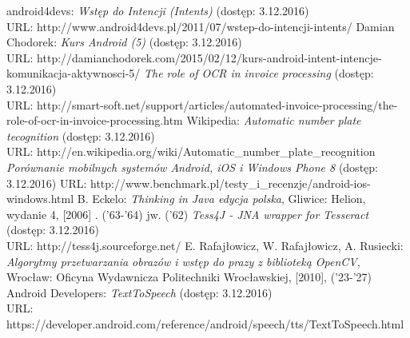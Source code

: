 \documentclass[eng,oneside]{mgr}
\begin{document}
\begin{thebibliography}{99}
 android4devs: \emph{Wstęp do Intencji (Intents)} (dostęp: 3.12.2016)\\
URL: http://www.android4devs.pl/2011/07/wstep-do-intencji-intents/
 Damian Chodorek: \emph{Kurs Android (5)} (dostęp: 3.12.2016)\\
URL: http://damianchodorek.com/2015/02/12/kurs-android-intent-intencje-komunikacja-aktywnosci-5/
 \emph{The role of OCR in invoice processing} (dostęp: 3.12.2016) \\
URL: http://smart-soft.net/support/articles/automated-invoice-processing/the-role-of-ocr-in-invoice-processing.htm
 Wikipedia: \emph{Automatic number plate tecognition} (dostęp: 3.12.2016) \\
URL: http://en.wikipedia.org/wiki/Automatic\_number\_plate\_recognition
 \emph{Porównanie mobilnych systemów Android, iOS i Windows Phone 8} (dostęp: 3.12.2016)
URL: http://www.benchmark.pl/testy\_i\_recenzje/android-ios-windows.html
 B. Eckelo: \emph{Thinking in Java edycja polska}, Gliwice: Helion, wydanie 4, [2006] .  ('63-'64)
 jw. ('62)
 \emph {Tess4J - JNA wrapper for Tesseract} (dostęp: 3.12.2016)\\
URL: http://tess4j.sourceforge.net/
 E. Rafajłowicz, W. Rafajłowicz, A. Rusiecki: \emph{Algorytmy przetwarzania obrazów i wstęp do prazy z biblioteką OpenCV}, Wrocław: Oficyna Wydawnicza Politechniki Wrocławskiej, [2010], ('23-'27)
 Android Developers: \emph{TextToSpeech} (dostęp: 3.12.2016) \\
URL: https://developer.android.com/reference/android/speech/tts/TextToSpeech.html
\end{thebibliography}
\end{document}
